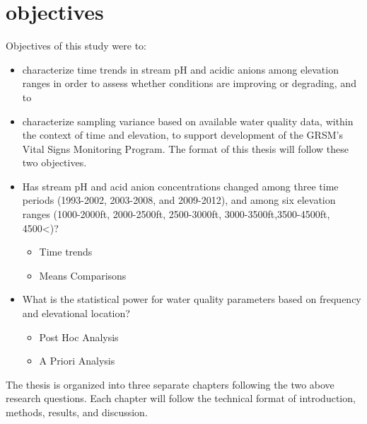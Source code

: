 \section{objectives}
Objectives of this study were to:
\begin{itemize}
\item  characterize time trends in stream pH and acidic anions among elevation ranges in order to assess whether conditions are improving or degrading, and to
\item characterize sampling variance based on available water quality data, within the context of time and elevation, to support development of the GRSM’s Vital Signs Monitoring Program.  The format of this thesis will follow these two objectives.  
\end{itemize}
\begin{itemize}
\item Has stream pH and acid anion concentrations changed among three time periods (1993-2002, 2003-2008, and 2009-2012), and among six elevation ranges (1000-2000ft, 2000-2500ft, 2500-3000ft, 3000-3500ft,3500-4500ft, 4500<)?
\begin{itemize}
\item Time trends
 \item Means Comparisons
\end{itemize}
\item What is the statistical power for water quality parameters based on frequency and elevational location?
\begin{itemize}
\item Post Hoc Analysis
\item A Priori Analysis
\end{itemize}
\end{itemize}
The thesis is organized into three separate chapters following the two above research questions. Each chapter will follow the technical format of introduction, methods, results, and discussion. 



